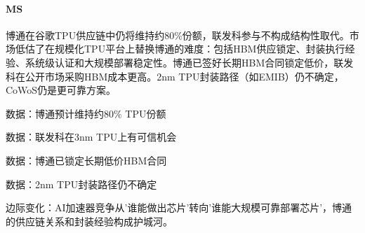 \documentclass[11pt]{ctexart}
\begin{document}
\paragraph{MS} 博通在谷歌TPU供应链中仍将维持约80\%份额，联发科参与不构成结构性取代。市场低估了在规模化TPU平台上替换博通的难度：包括HBM供应锁定、封装执行经验、系统级认证和大规模部署稳定性。博通已签好长期HBM合同锁定低价，联发科在公开市场采购HBM成本更高。2nm TPU封装路径（如EMIB）仍不确定，CoWoS仍是更可靠方案。
{\small\color{refgray}数据：博通预计维持约80\% TPU份额\par}
{\small\color{refgray}数据：联发科在3nm TPU上有可信机会\par}
{\small\color{refgray}数据：博通已锁定长期低价HBM合同\par}
{\small\color{refgray}数据：2nm TPU封装路径仍不确定\par}
{\small\color{refgray}边际变化：AI加速器竞争从'谁能做出芯片'转向'谁能大规模可靠部署芯片'，博通的供应链关系和封装经验构成护城河。\par}
\end{document}
